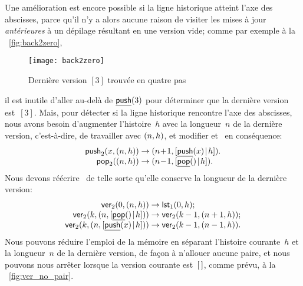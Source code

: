 Une amélioration est encore possible si la ligne historique atteint
l'axe des abscisses, parce qu'il n'y a alors aucune raison de visiter
les mises à jour \emph{antérieures} à un dépilage résultant en une
version vide; comme par exemple à la \fig~\vref{fig:back2zero},
\begin{figure}
\centering
\texttt{[image: back2zero]}
\caption{Dernière version $[3]$ trouvée en quatre pas}
\label{fig:back2zero}
\end{figure}
il est inutile d'aller au-delà de
\(\underline{\textsf{push}}(3)\) pour déterminer que la
dernière version est~\([3]\). Mais, pour détecter si la ligne
historique rencontre l'axe des abscisses, nous avons besoin
d'augmenter l'histoire~\(h\) avec la longueur~\(n\) de la dernière
version, c'est-à-dire, de travailler avec \(({n},{h})\), et modifier
et~ en conséquence:
\begin{equation*}
\begin{array}{@{}r@{\;}l@{\;}l@{}}
\fun{push}_2(x,\pair{n}{h}) & \rightarrow &
\pair{n\!+\!1}{\cons{\ufun{push}(x)}{h}}.\\
\fun{pop}_2(\pair{n}{h}) & \rightarrow &
\pair{n\!-\!1}{\cons{\ufun{pop}()}{h}}.
\end{array}
\end{equation*}
Nous devons réécrire~ de
telle sorte qu'elle conserve la longueur de la dernière version:
\begin{equation*}
\begin{array}{@{}r@{\;}l@{\;}l@{}}
\fun{ver}_2(0,\pair{n}{h}) & \rightarrow & \fun{lst}_1(0,h);\\
\fun{ver}_2(k,\pair{n}{\cons{\ufun{pop}()}{h}})
                      & \rightarrow & \fun{ver}_2(k-1,\pair{n+1}{h});\\
\fun{ver}_2(k,\pair{n}{\cons{\ufun{push}(x)}{h}})
                      & \rightarrow & \fun{ver}_2(k-1,\pair{n-1}{h}).
\end{array}
\end{equation*}
Nous pouvons réduire l'emploi de la mémoire en
séparant l'histoire courante~\(h\) et la longueur~\(n\) de la dernière
version, de façon à n'allouer aucune paire, et nous pouvons nous
arrêter lorsque la version courante est~\([\,]\), comme prévu, à la
\fig~\vref{fig:ver_no_pair}.
